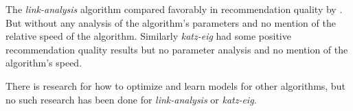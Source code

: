 The \textit{link-analysis} algorithm compared favorably in recommendation quality by \citep{huang2007comparison}. But without any analysis of the algorithm's parameters and no mention of the relative speed of the algorithm.  Similarly \textit{katz-eig} had some positive recommendation quality results \citep{shin2012multi} but no parameter analysis and no mention of the algorithm's speed.

There is research for how to optimize and learn models for other algorithms, but no such research has been done for \textit{link-analysis} or \textit{katz-eig}.



